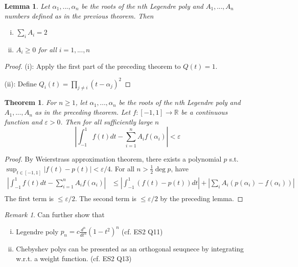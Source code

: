 \documentclass{article}
\theoremstyle{definition}
\theoremstyle{remark}
\newtheorem{rem}{Remark}
\theoremstyle{plain}
\newtheorem{lem}[defn]{Lemma}
\newtheorem{thm}[defn]{Theorem}
\newcommand{\RR}{\mathbb{R}}
\begin{document}
\begin{lem}
    Let $\alpha_1,...,\alpha_n$ be the roots of the $n$th Legendre poly and $A_1,...,A_n$ numbers defined as in the previous theorem. Then \begin{enumerate}[(i)]
        \item $\sum_iA_i=2$
        \item $A_i\ge 0$ for all $i=1,...,n$
    \end{enumerate}
\end{lem}
\begin{proof}
    (i): Apply the first part of the preceding theorem to $Q(t)=1$.

    (ii): Define $Q_i(t)=\prod_{j\neq i}(t-\alpha_j)^2$
\end{proof}
\begin{thm}
    For $n\ge 1$, let $\alpha_1,...,\alpha_n$ be the roots of the $n$th Legendre poly and $A_1,...,A_n$ as in the preceding theorem.
    Let $f:[-1,1]\to\RR$ be a continuous function and $\varepsilon>0$.
    Then for all sufficiently large $n$
    \[\left|\int_{-1}^1f(t)dt-\sum_{i=1}^nA_if(\alpha_i)\right|<\varepsilon\]
\end{thm}
\begin{proof}
    By Weierstrass approximation theorem, there exists a polynomial $p$ s.t. $\sup_{t\in[-1,1]}|f(t)-p(t)|<\varepsilon/4$. For all $n>\frac12\deg p$, have
    \begin{align*}
        \left|\int_{-1}^1f(t)dt-\sum_{i=1}^nA_if(\alpha_i)\right|&\le\left|\int_{-1}^1(f(t)-p(t))dt\right|+\left|\sum_iA_i(p(\alpha_i)-f(\alpha_i))\right|\\
    \end{align*}
    The first term is $\le \varepsilon/2$. The second term is $\le\varepsilon/2$ by the preceding lemma.
\end{proof}
\begin{rem}
    Can further show that \begin{enumerate}[(i)]
        \item Legendre poly $p_n=c\frac{d^n}{dt^n}(1-t^2)^n$ (cf. ES2 Q11)
        \item Chebyshev polys can be presented as an orthogonal seuqnece by integrating w.r.t. a weight function. (cf. ES2 Q13)
    \end{enumerate}
\end{rem}
\end{document}
